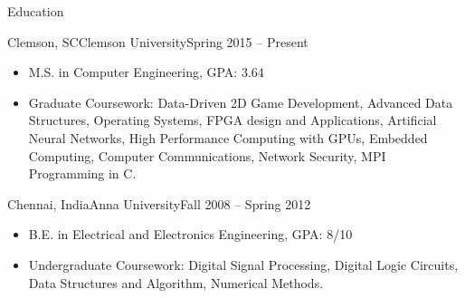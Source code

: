 \documentclass[]{SriramMadhivanan}
\begin{document}
	\begin{cvsection}{Education}
		\begin{cvsubsection}{Clemson, SC}{Clemson University}{Spring 2015 -- Present}
			\begin{itemize}
				\item M.S. in Computer Engineering, GPA: 3.64
				\item Graduate Coursework: Data-Driven 2D Game Development, Advanced Data Structures, Operating Systems, FPGA design and Applications, Artificial Neural Networks, High Performance Computing with GPUs, Embedded Computing, Computer Communications, Network Security, MPI Programming in C.
			\end{itemize}
		\end{cvsubsection}
		
		\begin{cvsubsection}{Chennai, India}{Anna University}{Fall 2008 -- Spring 2012}
			\begin{itemize}
				\item B.E. in Electrical and Electronics Engineering, GPA: 8/10
				\item Undergraduate Coursework: Digital Signal Processing, Digital Logic Circuits, Data Structures and Algorithm, Numerical Methods.
			\end{itemize}
		\end{cvsubsection}
	\end{cvsection}
	
\end{document}
